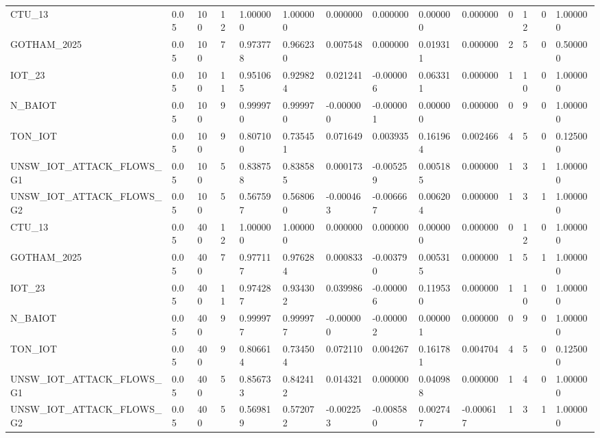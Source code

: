 \begin{tabular}{llllllllllllll}
CTU\_13 & 0.05 & 100 & 12 & 1.000000 & 1.000000 & 0.000000 & 0.000000 & 0.000000 & 0.000000 & 0 & 12 & 0 & 1.000000 \\
GOTHAM\_2025 & 0.05 & 100 & 7 & 0.973778 & 0.966230 & 0.007548 & 0.000000 & 0.019311 & 0.000000 & 2 & 5 & 0 & 0.500000 \\
IOT\_23 & 0.05 & 100 & 11 & 0.951065 & 0.929824 & 0.021241 & -0.000006 & 0.063311 & 0.000000 & 1 & 10 & 0 & 1.000000 \\
N\_BAIOT & 0.05 & 100 & 9 & 0.999970 & 0.999970 & -0.000000 & -0.000001 & 0.000000 & 0.000000 & 0 & 9 & 0 & 1.000000 \\
TON\_IOT & 0.05 & 100 & 9 & 0.807100 & 0.735451 & 0.071649 & 0.003935 & 0.161964 & 0.002466 & 4 & 5 & 0 & 0.125000 \\
UNSW\_IOT\_ATTACK\_FLOWS\_G1 & 0.05 & 100 & 5 & 0.838758 & 0.838585 & 0.000173 & -0.005259 & 0.005185 & 0.000000 & 1 & 3 & 1 & 1.000000 \\
UNSW\_IOT\_ATTACK\_FLOWS\_G2 & 0.05 & 100 & 5 & 0.567597 & 0.568060 & -0.000463 & -0.006667 & 0.006204 & 0.000000 & 1 & 3 & 1 & 1.000000 \\
CTU\_13 & 0.05 & 400 & 12 & 1.000000 & 1.000000 & 0.000000 & 0.000000 & 0.000000 & 0.000000 & 0 & 12 & 0 & 1.000000 \\
GOTHAM\_2025 & 0.05 & 400 & 7 & 0.977117 & 0.976284 & 0.000833 & -0.003790 & 0.005315 & 0.000000 & 1 & 5 & 1 & 1.000000 \\
IOT\_23 & 0.05 & 400 & 11 & 0.974287 & 0.934302 & 0.039986 & -0.000006 & 0.119530 & 0.000000 & 1 & 10 & 0 & 1.000000 \\
N\_BAIOT & 0.05 & 400 & 9 & 0.999977 & 0.999977 & -0.000000 & -0.000002 & 0.000001 & 0.000000 & 0 & 9 & 0 & 1.000000 \\
TON\_IOT & 0.05 & 400 & 9 & 0.806614 & 0.734504 & 0.072110 & 0.004267 & 0.161781 & 0.004704 & 4 & 5 & 0 & 0.125000 \\
UNSW\_IOT\_ATTACK\_FLOWS\_G1 & 0.05 & 400 & 5 & 0.856733 & 0.842412 & 0.014321 & 0.000000 & 0.040988 & 0.000000 & 1 & 4 & 0 & 1.000000 \\
UNSW\_IOT\_ATTACK\_FLOWS\_G2 & 0.05 & 400 & 5 & 0.569819 & 0.572072 & -0.002253 & -0.008580 & 0.002747 & -0.000617 & 1 & 3 & 1 & 1.000000 \\
\bottomrule
\end{tabular}
